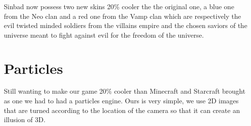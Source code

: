 \documentclass[article]{report}         %
\begin{document}
~\\~\\~\\~\\~\\~\\~\\~\\~\\~\\~\\~\\~\\~\\~\\~\\~\\~\\~\\~\\~\\~\\~\\~\\~\\~\\~\\~\\~\\~\\~\\~\\~\\~\\~\\~\\~\\~\\~\\~\\~\\~\\
Sinbad now possess two new skins 20\% cooler the the original one, a blue one from the Neo clan and a red one from the Vamp clan which are respectively the evil twisted minded soldiers from the villains empire and the chosen saviors of the universe meant to fight against evil for the freedom of the universe. \\

\newpage

      \section{Particles}

Still wanting to make our game 20\% cooler than Minecraft and Starcraft brought as one we had to had a particles engine. Ours is very simple, we use 2D images that are turned according to the location of the camera so that it can create an illusion of 3D. \\
\end{document}
